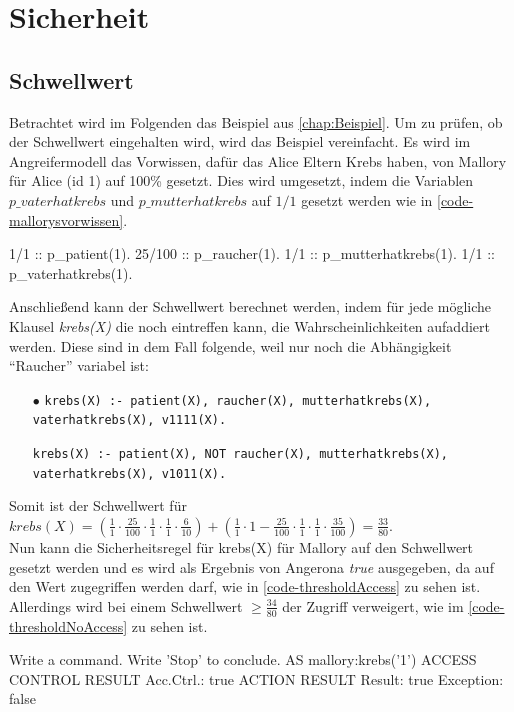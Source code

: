 \documentclass[german,version-2020-11]{uzl-thesis}
\begin{document}
\section{Sicherheit}
\subsection{Schwellwert}\label{sub:schwellwert}
Betrachtet wird im Folgenden das Beispiel aus \autoref{chap:Beispiel}. Um zu prüfen, ob der Schwellwert eingehalten wird, wird das Beispiel vereinfacht. Es wird im Angreifermodell das Vorwissen, dafür das Alice Eltern Krebs haben, von Mallory für Alice (id 1) auf 100\% gesetzt. Dies wird umgesetzt, indem die Variablen $p\_vaterhatkrebs$ und $p\_mutterhatkrebs$ auf $1/1$ gesetzt werden wie in \autoref{code-mallorysvorwissen}.
\begin{Pseudocode}[caption={Mallorys Vorwissen}, label={code-mallorysvorwissen}]
1/1 :: p\_patient(1).
25/100 :: p_raucher(1).
1/1 :: p_mutterhatkrebs(1).
1/1 :: p_vaterhatkrebs(1).
\end{Pseudocode}
Anschließend kann der Schwellwert berechnet werden, indem für jede mögliche Klausel \textit{krebs(X)} die noch eintreffen kann, die Wahrscheinlichkeiten aufaddiert werden. Diese sind in dem Fall folgende, weil nur noch die Abhängigkeit \enquote{Raucher} variabel ist:
\begin{itemize}
	\item[$\bullet$] \texttt{krebs(X) :- patient(X), raucher(X), mutterhatkrebs(X), vaterhatkrebs(X), v1111(X).}
	\item[\bullet] \texttt{krebs(X) :- patient(X), NOT raucher(X), mutterhatkrebs(X), vaterhatkrebs(X), v1011(X).}
\end{itemize}
Somit ist der Schwellwert für $krebs(X) = (\frac{1}{1} \cdot \frac{25}{100} \cdot \frac{1}{1} \cdot \frac{1}{1} \cdot \frac{6}{10}) + (\frac{1}{1} \cdot 1- \frac{25}{100} \cdot \frac{1}{1} \cdot \frac{1}{1} \cdot \frac{35}{100}) = \frac{33}{80} $. \\  Nun kann die Sicherheitsregel für krebs(X) für Mallory auf den Schwellwert gesetzt werden und es wird als Ergebnis von Angerona \textit{true} ausgegeben, da auf den Wert zugegriffen werden darf, wie in \autoref{code-thresholdAccess} zu sehen ist. Allerdings wird bei einem Schwellwert $ \geq \frac{34}{80}$ der Zugriff verweigert, wie im \autoref{code-thresholdNoAccess} zu sehen ist. 


\begin{Pseudocode}[caption={Angerona Ergebnis für Schwellwert=$\frac{33}{80}$}, label={code-thresholdAccess}]
Write a command. Write 'Stop' to conclude.
AS mallory:krebs('1')
ACCESS CONTROL RESULT
	Acc.Ctrl.: true
ACTION RESULT
	Result: true Exception: false
\end{Pseudocode}
\end{document}
